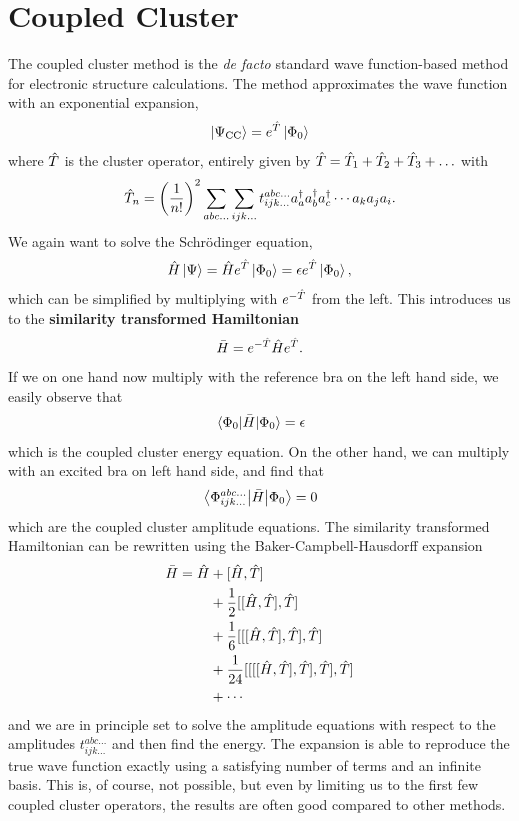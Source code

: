 \section{Coupled Cluster} \label{subsec:cc}
The coupled cluster method is the \textit{de facto} standard wave function-based method for electronic structure calculations. \cite{paldus_beginnings_2005} The method approximates the wave function with an exponential expansion, 
\begin{equation}
\ket{\Psi_{\text{CC}}}=e^{\hat{T}}\ket{\Phi_0}
\end{equation}
where $\hat{T}$ is the cluster operator, entirely given by $\hat{T}=\hat{T}_1+\hat{T}_2 +\hat{T}_3+\hdots$ with
\begin{equation}
\hat{T}_n = \left( \frac{1}{n!}\right)^2 \sum_{abc...} \sum_{ijk...} t_{ijk...}^{abc...}a_a^\dagger a_b^\dagger a_c^\dagger \cdots a_k a_j a_i.
\end{equation}
We again want to solve the Schrödinger equation,
\begin{equation}
\hat{H}\ket{\Psi}=\hat{H}e^{\hatT}\ket{\Phi_0}=\epsilon e^{\hatT}\ket{\Phi_0},
\end{equation}
which can be simplified by multiplying with $e^{-\hat{T}}$ from the left. This introduces us to the \textbf{similarity transformed Hamiltonian} 
\begin{equation}
\bar{H}=e^{-\hat{T}}\hat{H}e^{\hat{T}}.
\end{equation}
If we on one hand now multiply with the reference bra on the left hand side, we easily observe that
\begin{equation}
\mel{\Phi_0}{\bar{H}}{\Phi_0}=\epsilon
\end{equation}
which is the coupled cluster energy equation. On the other hand, we can multiply with an excited bra on left hand side, and find that
\begin{equation}
\mel{\Phi_{ijk\hdots}^{abc\hdots}}{\bar{H}}{\Phi_0}=0
\end{equation}
which are the coupled cluster amplitude equations. The similarity transformed Hamiltonian can be rewritten using the Baker-Campbell-Hausdorff expansion
\begin{align}
\label{eq:BCH}
\bar{H} = \hat{H} &+ [\hat{H},\hat{T}]\notag \\
&+ \frac{1}{2}[[\hat{H},\hat{T}],\hat{T}]\notag \\
&+ \frac{1}{6}[[[\hat{H},\hat{T}],\hat{T}],\hat{T}] \\
&+ \frac{1}{24}[[[[\hat{H},\hat{T}],\hat{T}],\hat{T}],\hat{T}] \notag \\
&+ \cdots \notag
\end{align}
and we are in principle set to solve the amplitude equations with respect to the amplitudes $t_{ijk\hdots}^{abc\hdots}$ and then find the energy. The expansion is able to reproduce the true wave function exactly using a satisfying number of terms and an infinite basis. This is, of course, not possible, but even by limiting us to the first few coupled cluster operators, the results are often good compared to other methods. \cite{daniel_crawford_introduction_2007}
